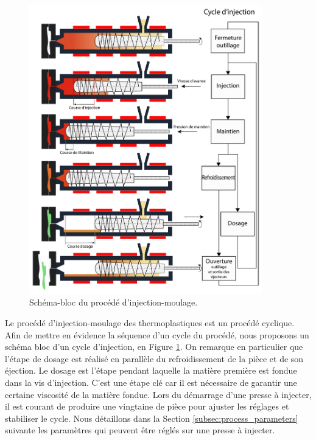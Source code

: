 \begin{figure}[hbtp]
	\centering
	\includegraphics[width=0.9\textwidth,height=\textheight,keepaspectratio]{../Chap1/Figures/SAPRISTI_Schema-cycle.pdf}
	\caption{Schéma-bloc du procédé d'injection-moulage.}
	\label{fig:cycle_injection}
\end{figure}

Le procédé d'injection-moulage des thermoplastiques est un procédé cyclique.
Afin de mettre en évidence la séquence d’un cycle du procédé, nous proposons un schéma bloc d’un cycle d’injection, en Figure \ref{fig:cycle_injection}.
On remarque en particulier que l'étape de dosage est réalisé en parallèle du refroidissement de la pièce et de son éjection.
Le dosage est l'étape pendant laquelle la matière première est fondue dans la vis d'injection.
C'est une étape clé car il est nécessaire de garantir une certaine viscosité de la matière fondue.
Lors du démarrage d'une presse à injecter, il est courant de produire une vingtaine de pièce pour ajuster les réglages et stabiliser le cycle.
Nous détaillons dans la Section \ref{subsec:process_parameters} suivante les paramètres qui peuvent être réglés sur une presse à injecter.

